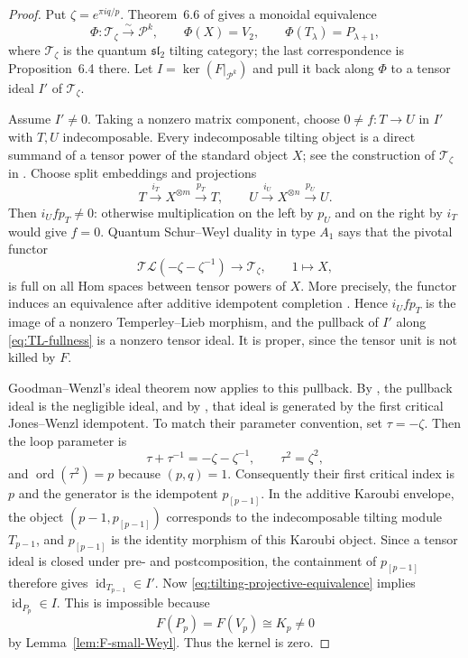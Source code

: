 \documentclass[12pt,leqno]{amsart}
\numberwithin{equation}{section}
\newcommand{\id}{\operatorname{id}}
\newcommand{\TL}{\mathcal{TL}}
\begin{document}
\begin{proof}
Put $\zeta=e^{\pi iq/p}$.  Theorem~6.6 of \cite{McRaeYang} gives a
monoidal equivalence
\begin{equation}\label{eq:tilting-projective-equivalence}
 \Phi:\mathcal T_\zeta\xrightarrow{\sim}\mathcal P^k,
 \qquad \Phi(X)=V_2,
 \qquad \Phi(T_\lambda)=P_{\lambda+1},
\end{equation}
where $\mathcal T_\zeta$ is the quantum $\mathfrak{sl}_2$ tilting category;
the last correspondence is Proposition~6.4 there.  Let
$I=\ker(F|_{\mathcal P^k})$ and pull it back along $\Phi$ to a tensor ideal
$I'$ of $\mathcal T_\zeta$.

Assume $I'\neq0$.  Taking a nonzero matrix component, choose
$0\neq f:T\to U$ in $I'$ with $T,U$ indecomposable.  Every indecomposable
tilting object is a direct summand of a tensor power of the standard object
$X$; see the construction of $\mathcal T_\zeta$ in
\cite[Section~6.1]{McRaeYang}.  Choose split embeddings and projections
\[
 T\xrightarrow{i_T}X^{\otimes m}\xrightarrow{p_T}T,
 \qquad
 U\xrightarrow{i_U}X^{\otimes n}\xrightarrow{p_U}U.
\]
Then $i_Ufp_T\neq0$: otherwise multiplication on the left by $p_U$ and on
the right by $i_T$ would give $f=0$.  Quantum Schur--Weyl duality in type
$A_1$ says that the pivotal functor
\begin{equation}\label{eq:TL-fullness}
 \TL(-\zeta-\zeta^{-1})\longrightarrow\mathcal T_\zeta,
 \qquad 1\longmapsto X,
\end{equation}
is full on all Hom spaces between tensor powers of $X$.  More precisely,
the functor induces an equivalence after additive idempotent completion
\cite[Proposition~2.13 and Remark~2.15]{SuttonTubbenhauerWedrichZhu}.
Hence $i_Ufp_T$ is the image of a nonzero Temperley--Lieb morphism, and the
pullback of $I'$ along
\eqref{eq:TL-fullness} is a nonzero tensor ideal.  It is proper, since the
tensor unit is not killed by $F$.

Goodman--Wenzl's ideal theorem now applies to this pullback.  By
\cite[Theorem~3.3]{GoodmanWenzl}, the pullback ideal is the negligible
ideal, and by \cite[Proposition~2.1]{GoodmanWenzl}, that ideal is generated
by the first critical Jones--Wenzl idempotent.  To match their parameter convention, set
$\tau=-\zeta$.  Then the loop parameter is
\[
 \tau+\tau^{-1}=-\zeta-\zeta^{-1},
 \qquad \tau^2=\zeta^2,
\]
and $\operatorname{ord}(\tau^2)=p$ because $(p,q)=1$.  Consequently their
first critical index is $p$ and the generator is the idempotent
$p_{[p-1]}$.  In the additive Karoubi envelope, the object
$(p-1,p_{[p-1]})$ corresponds to the indecomposable tilting module
$T_{p-1}$, and $p_{[p-1]}$ is the identity morphism of this Karoubi object.
Since a tensor ideal is closed under pre- and postcomposition, the
containment of $p_{[p-1]}$ therefore gives
\(\id_{T_{p-1}}\in I'\).  Now
\eqref{eq:tilting-projective-equivalence} implies \(\id_{P_p}\in I\).
This is impossible because
\[
 F(P_p)=F(V_p)\cong K_p\neq0
\]
by Lemma~\ref{lem:F-small-Weyl}.  Thus the kernel is zero.
\end{proof}
\end{document}
